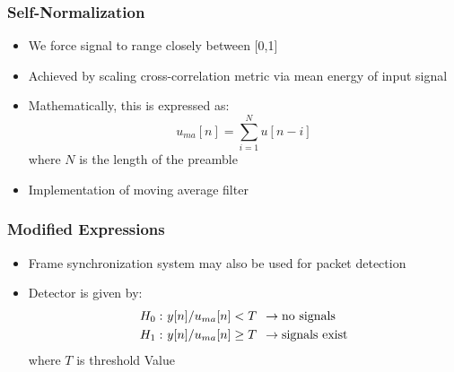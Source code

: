 \documentclass[10pt]{beamer}
\begin{document}
\frame
{
  \frametitle{Self-Normalization}
    \begin{itemize}
        \item We force signal to range closely between [0,1]  
\item Achieved by scaling cross-correlation metric via mean energy of input signal
	\item Mathematically, this is expressed as:
        \begin{equation}
          u_{ma}[n] = \sum\limits_{i=1}^{N} u[n-i]
        \end{equation}
        where $N$ is the length of the preamble
        \item Implementation of moving average filter
    \end{itemize}
}


\frame
{
  \frametitle{Modified Expressions }
    \begin{itemize}
	\item Frame synchronization system may also be used for packet detection
	\item Detector is given by:
	\begin{equation}
        \begin{split}
            H_0:&~y[n]/u_{ma}[n]<T\hspace{1ex}\rightarrow\mathrm{no~signals}\\
           H_1:&~y[n]/u_{ma}[n]\geq{T}\hspace{1ex}\rightarrow\mathrm{signals~exist}
        \end{split}
        \end{equation}
        where $T$ is threshold Value
    \end{itemize}
}
\end{document}
